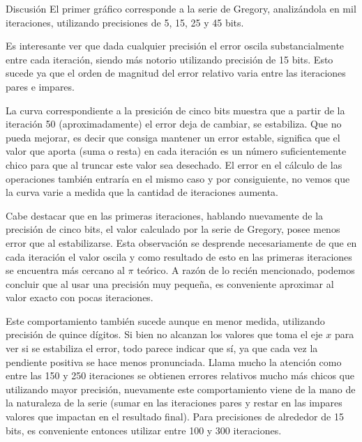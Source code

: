 \begin{section}{Discusión}
	El primer gráfico corresponde a la serie de Gregory, analizándola en mil iteraciones, utilizando precisiones de 5, 15, 25 y 45 bits. 
	
	Es interesante ver que dada cualquier precisión el error oscila substancialmente entre cada iteración, siendo más notorio utilizando precisión de 15 bits. Esto sucede ya que el orden de magnitud del error relativo varia entre las iteraciones pares e impares. 
	
	La curva correspondiente a la presición de cinco bits muestra que a partir de la iteración 50 (aproximadamente) el error deja de cambiar, se estabiliza. Que no pueda mejorar, es decir que consiga mantener un error estable, significa que el valor que aporta (suma o resta) en cada iteración es un número suficientemente chico para que al truncar este valor sea desechado. El error en el cálculo de las operaciones también entraría en el mismo caso y por consiguiente, no vemos que la curva varie a medida que la cantidad de iteraciones aumenta.
	
	Cabe destacar que en las primeras iteraciones, hablando nuevamente de la precisión de cinco bits, el valor calculado por la serie de Gregory, posee menos error que al estabilizarse. Esta observación se desprende necesariamente de que en cada iteración el valor oscila y como resultado de esto en las primeras iteraciones se encuentra más cercano al $\pi$ teórico. A razón de lo recién mencionado, podemos concluir que al usar una precisión muy pequeña, es conveniente aproximar al valor exacto con pocas iteraciones.
	
	Este comportamiento también sucede aunque en menor medida, utilizando precisión de quince dígitos. Si bien no alcanzan los valores que toma el eje $x$ para ver si se estabiliza el error, todo parece indicar que sí, ya que cada vez la pendiente positiva se hace menos pronunciada. Llama mucho la atención como entre las 150 y 250 iteraciones se obtienen errores relativos mucho más chicos que utilizando mayor precisión, nuevamente este comportamiento viene de la mano de la naturaleza de la serie (sumar en las iteraciones pares y restar en las impares valores que impactan en el resultado final). Para precisiones de alrededor de 15 bits, es conveniente entonces utilizar entre 100 y 300 iteraciones.


\end{section}
